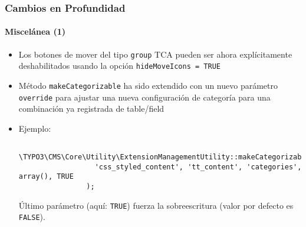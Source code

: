 \begin{frame}[fragile]
	\frametitle{Cambios en Profundidad}
	\framesubtitle{Miscelánea (1)}

	\begin{itemize}

		\item Los botones de mover del tipo \texttt{group} TCA pueden ser ahora explícitamente
			deshabilitados usando la opción \texttt{hideMoveIcons = TRUE}

		\item Método \texttt{makeCategorizable} ha sido extendido con un nuevo parámetro
			\texttt{override} para ajustar una nueva configuración de categoría para una combinación ya
			registrada de table/field

		\item Ejemplo:

			\begin{lstlisting}
				\TYPO3\CMS\Core\Utility\ExtensionManagementUtility::makeCategorizable(
				  'css_styled_content', 'tt_content', 'categories', array(), TRUE
				);
			\end{lstlisting}

			\small
				Último parámetro (aquí: \texttt{TRUE}) fuerza la sobreescritura (valor por defecto es \texttt{FALSE}).
			\normalsize

	\end{itemize}

\end{frame}


